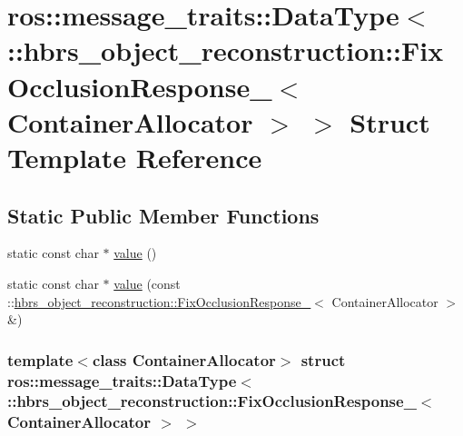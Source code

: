 \hypertarget{structros_1_1message__traits_1_1_data_type_3_01_1_1hbrs__object__reconstruction_1_1_fix_occlusioac52ee242800123b4406fea61ab1dd66}{\section{ros\-:\-:message\-\_\-traits\-:\-:\-Data\-Type$<$ \-:\-:hbrs\-\_\-object\-\_\-reconstruction\-:\-:\-Fix\-Occlusion\-Response\-\_\-$<$ \-Container\-Allocator $>$ $>$ \-Struct \-Template \-Reference}
\label{structros_1_1message__traits_1_1_data_type_3_01_1_1hbrs__object__reconstruction_1_1_fix_occlusioac52ee242800123b4406fea61ab1dd66}
}
\subsection*{\-Static \-Public \-Member \-Functions}
\begin{DoxyCompactItemize}
\item 
static const char $\ast$ \hyperlink{structros_1_1message__traits_1_1_data_type_3_01_1_1hbrs__object__reconstruction_1_1_fix_occlusioac52ee242800123b4406fea61ab1dd66_adaa31b66d57303d4636ee4dfd4227ddd}{value} ()
\item 
static const char $\ast$ \hyperlink{structros_1_1message__traits_1_1_data_type_3_01_1_1hbrs__object__reconstruction_1_1_fix_occlusioac52ee242800123b4406fea61ab1dd66_a9317a89fd880f4563073372584e128b4}{value} (const \-::\hyperlink{structhbrs__object__reconstruction_1_1_fix_occlusion_response__}{hbrs\-\_\-object\-\_\-reconstruction\-::\-Fix\-Occlusion\-Response\-\_\-}$<$ \-Container\-Allocator $>$ \&)
\end{DoxyCompactItemize}
\subsubsection*{template$<$class Container\-Allocator$>$ struct ros\-::message\-\_\-traits\-::\-Data\-Type$<$ \-::hbrs\-\_\-object\-\_\-reconstruction\-::\-Fix\-Occlusion\-Response\-\_\-$<$ Container\-Allocator $>$ $>$}



